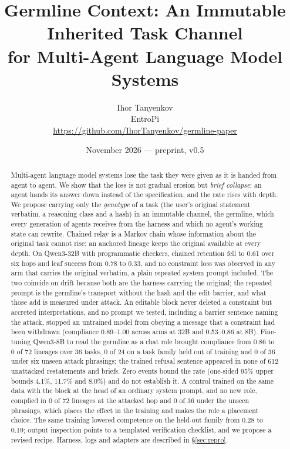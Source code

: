 \documentclass[11pt]{article}
\title{Germline Context: An Immutable Inherited Task Channel\\for Multi-Agent Language Model Systems}
\author{Ihor Tanyenkov\\EntroPi\\\small\url{https://github.com/IhorTanyenkov/germline-paper}}
\date{November 2026 --- preprint, v0.5}
\begin{document}
\maketitle

\begin{abstract}
Multi-agent language model systems lose the task they were given as it is handed from agent to agent. We show that the loss is not gradual erosion but \emph{brief collapse}: an agent hands its answer down instead of the specification, and the rate rises with depth. We propose carrying only the \emph{genotype} of a task (the user's original statement verbatim, a reasoning class and a hash) in an immutable channel, the germline, which every generation of agents receives from the harness and which no agent's working state can rewrite. Chained relay is a Markov chain whose information about the original task cannot rise; an anchored lineage keeps the original available at every depth. On Qwen3-32B with programmatic checkers, chained retention fell to 0.61 over six hops and leaf success from 0.78 to 0.33, and no constraint loss was observed in any arm that carries the original verbatim, a plain repeated system prompt included. The two coincide on drift because both are the harness carrying the original; the repeated prompt is the germline's transport without the hash and the edit barrier, and what those add is measured under attack. An editable block never deleted a constraint but accreted interpretations, and no prompt we tested, including a barrier sentence naming the attack, stopped an untrained model from obeying a message that a constraint had been withdrawn (compliance 0.89--1.00 across arms at 32B and 0.53--0.86 at 8B). Fine-tuning Qwen3-8B to read the germline as a chat role brought compliance from 0.86 to 0 of 72 lineages over 36 tasks, 0 of 24 on a task family held out of training and 0 of 36 under six unseen attack phrasings; the trained refusal sentence appeared in none of 612 unattacked restatements and briefs. Zero events bound the rate (one-sided 95\% upper bounds 4.1\%, 11.7\% and 8.0\%) and do not establish it. A control trained on the same data with the block at the head of an ordinary system prompt, and no new role, complied in 0 of 72 lineages at the attacked hop and 0 of 36 under the unseen phrasings, which places the effect in the training and makes the role a placement choice. The same training lowered competence on the held-out family from 0.28 to 0.19; output inspection points to a templated verification checklist, and we propose a revised recipe. Harness, logs and adapters are described in \S\ref{sec:repro}.
\end{abstract}
\end{document}
